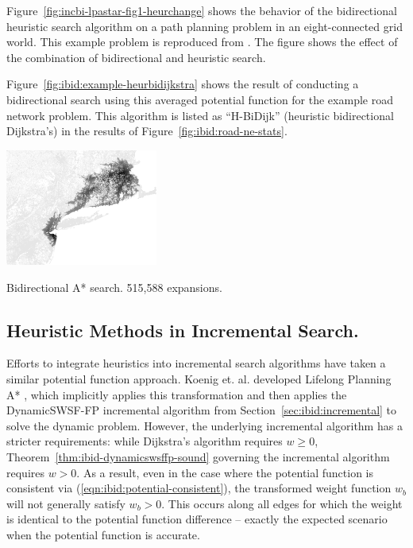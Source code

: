 Figure~\ref{fig:incbi-lpastar-fig1-heurchange} shows the behavior
of the bidirectional heuristic search algorithm
on a path planning problem in an eight-connected grid world.
This example problem is reproduced from \citep{koenig2004lpastar}.
The figure shows the effect of the combination of bidirectional
and heuristic search.

Figure~\ref{fig:ibid:example-heurbidijkstra} shows the result
of conducting a bidirectional search using this averaged
potential function for the example road network problem.
This algorithm is listed as ``H-BiDijk''
(heuristic bidirectional Dijkstra's)
in the results of Figure~\ref{fig:ibid:road-ne-stats}.

\begin{marginfigure}%
   \centering%
   \includegraphics[width=5cm]{figs/incbi-road-ne/singleshot/example-heurbidijkstra.png}%
   \caption{Bidirectional A* search.
      515,588 expansions.}%
   \label{fig:ibid:example-heurbidijkstra}%
\end{marginfigure}


\subsection{Heuristic Methods in Incremental Search.}
\label{subsec:ibid:heuristic-incremental}

Efforts to integrate heuristics into incremental search algorithms
have taken a similar potential function approach.
Koenig et. al. developed Lifelong Planning A* \citep{koenig2004lpastar},
which implicitly applies this transformation
and then applies the DynamicSWSF-FP incremental algorithm
\citep{ramalingam1996dynamicswsffp}
from Section~\ref{sec:ibid:incremental}
to solve the dynamic problem.
However,
the underlying incremental algorithm has a stricter requirements:
while Dijkstra's algorithm requires $w \geq 0$,
Theorem~\ref{thm:ibid-dynamicswsffp-sound} governing
the incremental algorithm requires $w > 0$.
As a result,
even in the case where the potential function is consistent
via (\ref{eqn:ibid:potential-consistent}),
the transformed weight function $w_b$ will not generally satisfy
$w_b > 0$.
This occurs along all edges for which the weight is identical to
the potential function difference
-- exactly the expected scenario when the potential function is
accurate.

